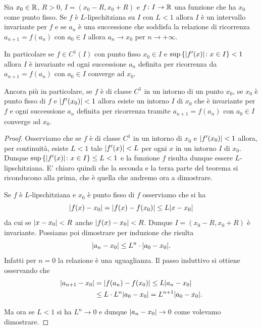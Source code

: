 \begin{theorem}
Sia $x_0\in {\mathbb R}$, $R>0$, $I=(x_0 - R, x_0+R)$ e $f\colon I \to {\mathbb R}$
una funzione che ha $x_0$ come punto fisso.
Se $f$ è $L$-lipschitziana su $I$ con $L<1$ allora $I$ è un intervallo
invariante per $f$ e se $a_n$ è una successione che soddisfa la relazione di ricorrenza $a_{n+1} = f(a_n)$ con $a_0 \in I$
allora $a_n \to x_0$ per $n\to +\infty$.

In particolare se $f\in C^1(I)$ con punto fisso $x_0 \in I$ e $\sup{\left\{ {\left|f'(x)\right|}\colon x\in I \right\}} < 1$ allora $I$ è invariante ed ogni successione $a_n$ definita per ricorrenza da $a_{n+1}=f(a_n)$ con $a_0 \in I$ converge ad $x_0$.

Ancora più in particolare, se $f$ è di classe $C^1$ in un intorno di un punto $x_0$, se $x_0$ è punto fisso di $f$ e ${\left|f'(x_0)\right|}<1$ allora
esiste un intorno $I$ di $x_0$ che è invariante per $f$ e ogni successione $a_n$ definita per ricorrenza tramite $a_{n+1}= f(a_n)$ con $a_0\in I$ converge ad $x_0$.
\end{theorem}
\begin{proof}
Osserviamo che se $f$ è di classe $C^1$ in un intorno di $x_0$ e ${\left|f'(x_0)\right|} < 1$ allora, per continuità, esiste $L<1$ tale ${\left|f'(x)\right|} < L$ per ogni $x$ in un intorno $I$ di $x_0$. Dunque $\sup{\left\{ {\left|f'(x)\right|}\colon x \in I \right\}} \le L < 1$ e la funzione $f$ risulta dunque essere $L$-lipschitziana. E' chiaro quindi che la seconda e la terza parte del teorema si riconducono alla prima, che è quella che andremo ora a dimostrare.

Se $f$ è $L$-lipschitziana e $x_0$ è punto fisso di $f$ osserviamo che si ha
\[
{\left|f(x) - x_0\right|} = {\left|f(x) - f(x_0)\right|} \le L {\left|x-x_0\right|}
\]
da cui se ${\left|x - x_0\right|} < R$ anche ${\left|f(x) - x_0\right|} < R$.
Dunque $I = (x_0-R, x_0+R)$ è invariante.
Possiamo poi dimostrare per induzione che risulta
\[
 {\left|a_n - x_0\right|} \le L^n \cdot {\left|a_0-x_0\right|}.
\]
Infatti per $n=0$ la relazione è una uguaglianza. Il passo induttivo si ottiene osservando che
\begin{align*}
{\left|a_{n+1} - x_0\right|}
 &= {\left|f(a_n) - f(x_0)\right|}
 \le L {\left|a_n - x_0\right|} \\
 &\le L\cdot L^n{\left|a_0-x_0\right|}
 = L^{n+1}{\left|a_0-x_0\right|}.
\end{align*}

Ma ora se $L<1$ si ha $L^n\to 0$ e dunque ${\left|a_n -x_0\right|} \to 0$ come volevamo dimostrare.
\end{proof}

